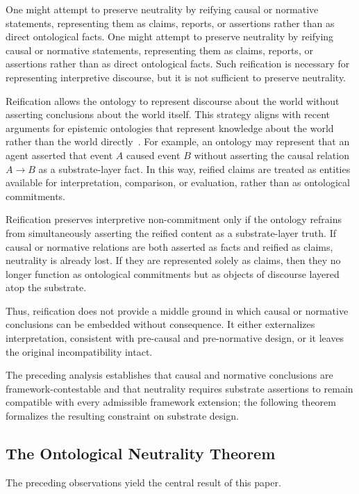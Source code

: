 One might attempt to preserve neutrality by
reifying causal or normative statements,
representing them as claims, reports, or assertions
rather than as direct ontological facts.
One might attempt to preserve neutrality by reifying causal or normative statements,
representing them as claims, reports, or assertions rather than as direct ontological facts.
Such reification is necessary for representing interpretive discourse,
but it is not sufficient to preserve neutrality.

Reification allows the ontology to represent discourse about the world
without asserting conclusions about the world itself.
This strategy aligns with recent arguments for epistemic ontologies
that represent knowledge about the world
rather than the world directly~\citep{kassel2023epistemic}.
For example, an ontology may represent that
an agent asserted that event $A$ caused event $B$
without asserting the causal relation $A \rightarrow B$
as a substrate-layer fact.
In this way, reified claims are treated as entities
available for interpretation, comparison, or evaluation,
rather than as ontological commitments.

Reification preserves interpretive non-commitment
only if the ontology refrains from simultaneously
asserting the reified content as a substrate-layer truth.
If causal or normative relations are both asserted
as facts and reified as claims, neutrality is already lost.
If they are represented solely as claims,
then they no longer function as ontological commitments
but as objects of discourse layered atop the substrate.

Thus, reification does not provide a middle ground
in which causal or normative conclusions
can be embedded without consequence.
It either externalizes interpretation,
consistent with pre-causal and pre-normative design,
or it leaves the original incompatibility intact.

The preceding analysis establishes that
causal and normative conclusions are
framework-contestable and that
neutrality requires substrate assertions
to remain compatible with every admissible framework extension;
the following theorem formalizes the resulting constraint on substrate design.

\subsection{The Ontological Neutrality Theorem}
\label{subsec:formal-proof}

The preceding observations yield the central result of this paper.

